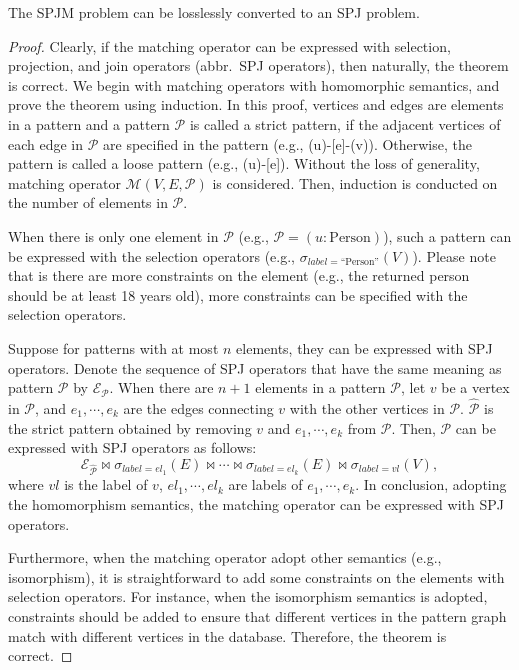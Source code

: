 \begin{theorem}
    \label{theorem:spjm-to-spj}
    The SPJM problem can be losslessly converted to an SPJ problem.
\end{theorem}
\begin{proof}
    Clearly, if the matching operator can be expressed with selection, projection, and join operators (abbr.~SPJ operators), then naturally, the theorem is correct.
    We begin with matching operators with homomorphic semantics, and prove the theorem using induction.
    In this proof, vertices and edges are elements in a pattern and a pattern $\mathcal{P}$ is called a strict pattern, if the adjacent vertices of each edge in $\mathcal{P}$ are specified in the pattern (e.g., (u)-[e]-(v)).
    Otherwise, the pattern is called a loose pattern (e.g., (u)-[e]).
    Without the loss of generality, matching operator $\mathcal{M}(V, E, \mathcal{P})$ is considered.
    Then, induction is conducted on the number of elements in $\mathcal{P}$.
    
    When there is only one element in $\mathcal{P}$ (e.g., $\mathcal{P}=(u:\text{Person})$), such a pattern can be expressed with the selection operators (e.g., $\sigma_{label=\text{``Person''}}(V)$).
    Please note that is there are more constraints on the element (e.g., the returned person should be at least 18 years old), more constraints can be specified with the selection operators.

    Suppose for patterns with at most $n$ elements, they can be expressed with SPJ operators.
    Denote the sequence of SPJ operators that have the same meaning as pattern $\mathcal{P}$ by $\mathcal{E}_{\mathcal{P}}$.
    When there are $n+1$ elements in a pattern $\mathcal{P}$, let $v$ be a vertex in $\mathcal{P}$, and $e_1, \cdots, e_k$ are the edges connecting $v$ with the other vertices in $\mathcal{P}$.
    $\widehat{\mathcal{P}}$ is the strict pattern obtained by removing $v$ and $e_1, \cdots, e_k$ from $\mathcal{P}$.
    Then, $\mathcal{P}$ can be expressed with SPJ operators as follows:
    \begin{equation*}
        \mathcal{E}_{\widehat{\mathcal{P}}} \Join \sigma_{label=el_1}(E) \Join \cdots \Join \sigma_{label=el_k}(E) \Join \sigma_{label=vl}(V),
    \end{equation*}
    where $vl$ is the label of $v$, $el_1, \cdots, el_k$ are labels of $e_1, \cdots, e_k$.
    In conclusion, adopting the homomorphism semantics, the matching operator can be expressed with SPJ operators.

    Furthermore, when the matching operator adopt other semantics (e.g., isomorphism), it is straightforward to add some constraints on the elements with selection operators.
    For instance, when the isomorphism semantics is adopted, constraints should be added to ensure that different vertices in the pattern graph match with different vertices in the database.
    Therefore, the theorem is correct. 
\end{proof}